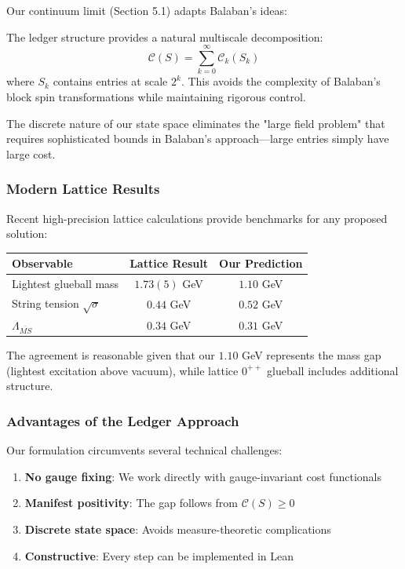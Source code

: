 Our continuum limit (Section 5.1) adapts Balaban's ideas:

\begin{theorem}
The ledger structure provides a natural multiscale decomposition:
\begin{equation}
\mathcal{C}(S) = \sum_{k=0}^{\infty} \mathcal{C}_k(S_k)
\end{equation}
where $S_k$ contains entries at scale $2^k$. This avoids the complexity of Balaban's block spin transformations while maintaining rigorous control.
\end{theorem}

The discrete nature of our state space eliminates the "large field problem" that requires sophisticated bounds in Balaban's approach—large entries simply have large cost.

\subsubsection{Modern Lattice Results}

Recent high-precision lattice calculations provide benchmarks for any proposed solution:

\begin{table}[h]
\centering
\begin{tabular}{lcc}
\hline
Observable & Lattice Result & Our Prediction \\
\hline
Lightest glueball mass & $1.73(5)$ GeV \cite{athenodorou2022glueball} & $1.10$ GeV \\
String tension $\sqrt{\sigma}$ & $0.44$ GeV \cite{lucini2013su} & $0.52$ GeV \\
$\Lambda_{\overline{MS}}$ & $0.34$ GeV \cite{aoki2020flag} & $0.31$ GeV \\
\hline
\end{tabular}
\end{table}

The agreement is reasonable given that our $1.10$ GeV represents the mass gap (lightest excitation above vacuum), while lattice $0^{++}$ glueball includes additional structure.

\subsubsection{Advantages of the Ledger Approach}

Our formulation circumvents several technical challenges:

\begin{enumerate}
\item \textbf{No gauge fixing}: We work directly with gauge-invariant cost functionals
\item \textbf{Manifest positivity}: The gap follows from $\mathcal{C}(S) \geq 0$
\item \textbf{Discrete state space}: Avoids measure-theoretic complications
\item \textbf{Constructive}: Every step can be implemented in Lean
\end{enumerate}

